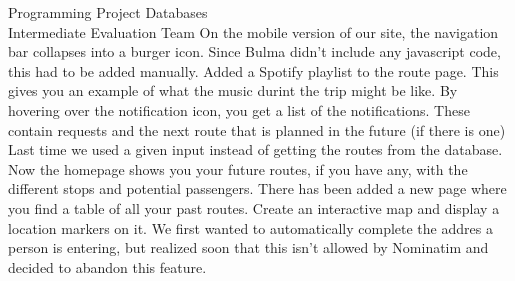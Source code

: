 \documentclass{article}
\newcounter{team}
\begin{document}
\begin{Minutes}{Programming Project Databases \\ Intermediate Evaluation Team }
    		        On the mobile version of our site, the navigation bar collapses into a burger icon. Since Bulma didn't include any javascript code, this had to be added manually.
    		        Added a Spotify playlist to the route page. This gives you an example of what the music durint the trip might be like.
    			    By hovering over the notification icon, you get a list of the notifications. These contain requests and the next route that is planned in the future (if there is one)
    			    Last time we used a given input instead of getting the routes from the database. Now the homepage shows you your future routes, if you have any, with the different stops and potential passengers.
    			    There has been added a new page where you find a table of all your past routes.
    			    Create an interactive map and display a location markers on it.
    			    We first wanted to automatically complete the addres a person is entering, but realized soon that this isn't allowed by Nominatim and decided to abandon this feature.


\end{Minutes}
\end{document}
